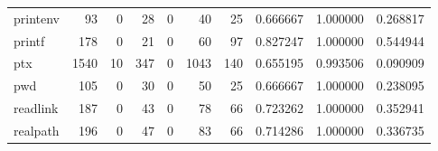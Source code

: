 \begin{tabular}{lrrrrrrrrr}
printenv  &                                                 93 &                                                  0 &                                                 28 &                                                  0 &                                                 40 &                                                 25 &                                           0.666667 &                               1.000000 &                             0.268817 \\
printf    &                                                178 &                                                  0 &                                                 21 &                                                  0 &                                                 60 &                                                 97 &                                           0.827247 &                               1.000000 &                             0.544944 \\
ptx       &                                               1540 &                                                 10 &                                                347 &                                                  0 &                                               1043 &                                                140 &                                           0.655195 &                               0.993506 &                             0.090909 \\
pwd       &                                                105 &                                                  0 &                                                 30 &                                                  0 &                                                 50 &                                                 25 &                                           0.666667 &                               1.000000 &                             0.238095 \\
readlink  &                                                187 &                                                  0 &                                                 43 &                                                  0 &                                                 78 &                                                 66 &                                           0.723262 &                               1.000000 &                             0.352941 \\
realpath  &                                                196 &                                                  0 &                                                 47 &                                                  0 &                                                 83 &                                                 66 &                                           0.714286 &                               1.000000 &                             0.336735 \\

\end{tabular}
